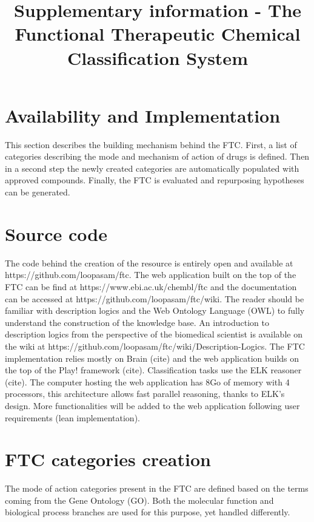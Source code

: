 \documentclass{bioinfo}
\begin{document}

\title[Supplementary information - The Functional Therapeutic Chemical Classification System]{Supplementary information - 
The Functional Therapeutic Chemical Classification System}

\section*{Availability and Implementation}

This section describes the building mechanism behind the FTC. 
First, a list of categories describing the mode and mechanism of action of drugs is defined. 
Then in a second step the newly created categories are automatically populated with approved compounds. 
Finally, the FTC is evaluated and repurposing hypotheses can be generated.

\section{Source code}
The code behind the creation of the resource is entirely open and available 
at {{https://github.com/loopasam/ftc}}. The web application built on the top of the 
FTC can be find at {{https://www.ebi.ac.uk/chembl/ftc}} and the documentation can be 
accessed at {{https://github.com/loopasam/ftc/wiki}}. The reader should be familiar with 
description logics and the Web Ontology Language (OWL) to fully understand the construction of the 
knowledge base. An introduction to description logics from the perspective of the biomedical scientist is 
available on the wiki at {{https://github.com/loopasam/ftc/wiki/Description-Logics}}. The FTC implementation 
relies mostly on Brain (cite) and the web application builds on the top of the Play! framework (cite). 
Classification tasks use the ELK reasoner (cite). The computer hosting the web application has 8Go of memory 
with 4 processors, this architecture allows fast parallel reasoning, thanks to ELK’s design. More functionalities 
will be added to the web application following user requirements (lean implementation).

\section{FTC categories creation}
The mode of action categories present in the FTC are defined based on the terms coming from the 
Gene Ontology (GO). Both the molecular function and biological process branches are used for this purpose, yet handled differently.
\end{document}
